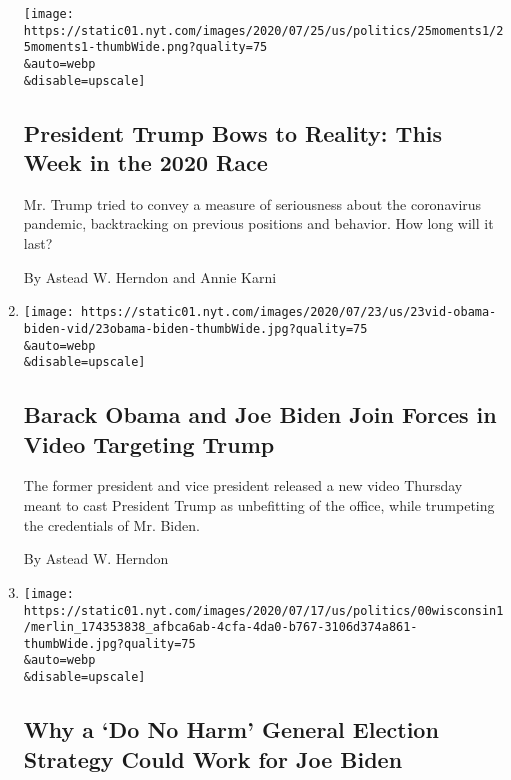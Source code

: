\begin{enumerate}
  \texttt{[image: https://static01.nyt.com/images/2020/07/25/us/politics/25moments1/25moments1-thumbWide.png?quality=75\\\&auto=webp\\\&disable=upscale]}

  \hypertarget{president-trump-bows-to-reality-this-week-in-the-2020-race}{%
  \subsection{President Trump Bows to Reality: This Week in the 2020
  Race}\label{president-trump-bows-to-reality-this-week-in-the-2020-race}}

  Mr. Trump tried to convey a measure of seriousness about the
  coronavirus pandemic, backtracking on previous positions and behavior.
  How long will it last?

  By Astead W. Herndon and Annie Karni
\item
  \href{/2020/07/23/us/politics/barack-obama-joe-biden-video.html}{}

  \texttt{[image: https://static01.nyt.com/images/2020/07/23/us/23vid-obama-biden-vid/23obama-biden-thumbWide.jpg?quality=75\\\&auto=webp\\\&disable=upscale]}

  \hypertarget{barack-obama-and-joe-biden-join-forces-in-video-targeting-trump}{%
  \subsection{Barack Obama and Joe Biden Join Forces in Video Targeting
  Trump}\label{barack-obama-and-joe-biden-join-forces-in-video-targeting-trump}}

  The former president and vice president released a new video Thursday
  meant to cast President Trump as unbefitting of the office, while
  trumpeting the credentials of Mr. Biden.

  By Astead W. Herndon
\item
  \href{/2020/07/19/us/politics/joe-biden-wisconsin-election.html}{}

  \texttt{[image: https://static01.nyt.com/images/2020/07/17/us/politics/00wisconsin1/merlin\_174353838\_afbca6ab-4cfa-4da0-b767-3106d374a861-thumbWide.jpg?quality=75\\\&auto=webp\\\&disable=upscale]}

  \hypertarget{why-a-do-no-harm-general-election-strategy-could-work-for-joe-biden}{%
  \subsection{Why a `Do No Harm' General Election Strategy Could Work
  for Joe
  Biden}\label{why-a-do-no-harm-general-election-strategy-could-work-for-joe-biden}}


\end{enumerate}
